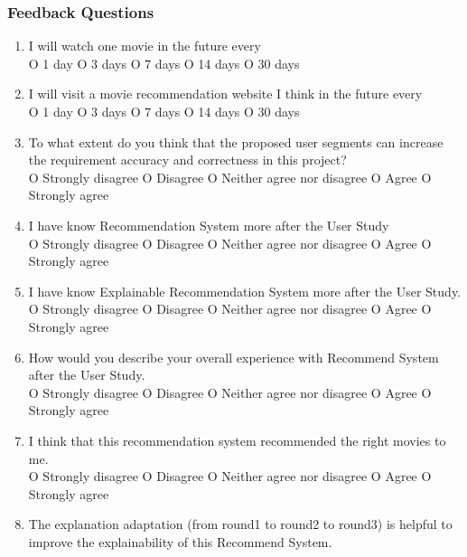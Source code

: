 \subsubsection{Feedback Questions}

\begin{enumerate}
\item I will watch one movie in the future every \\

O 1 day  O 3 days O 7 days O 14 days O 30 days

\item I will visit a movie recommendation website I think in the future every \\

O 1 day  O 3 days O 7 days O 14 days O 30 days

\item To what extent do you think that the proposed user segments can increase the requirement accuracy and correctness in this project? \\

O Strongly disagree O Disagree O Neither agree nor disagree O Agree O Strongly agree

\item I have know Recommendation System more after the User Study\\  

O Strongly disagree O Disagree O Neither agree nor disagree O Agree O Strongly agree

\item I have know Explainable Recommendation System more after the User Study. \\

O Strongly disagree O Disagree O Neither agree nor disagree O Agree O Strongly agree

\item How would you describe your overall experience with Recommend System after the User Study. \\

O Strongly disagree O Disagree O Neither agree nor disagree O Agree O Strongly agree

\item I think that this recommendation system recommended the right movies to me. \\

O Strongly disagree O Disagree O Neither agree nor disagree O Agree O Strongly agree

\item The explanation adaptation (from round1 to round2 to round3) is helpful to improve the explainability of this Recommend System.\\


\end{enumerate}
